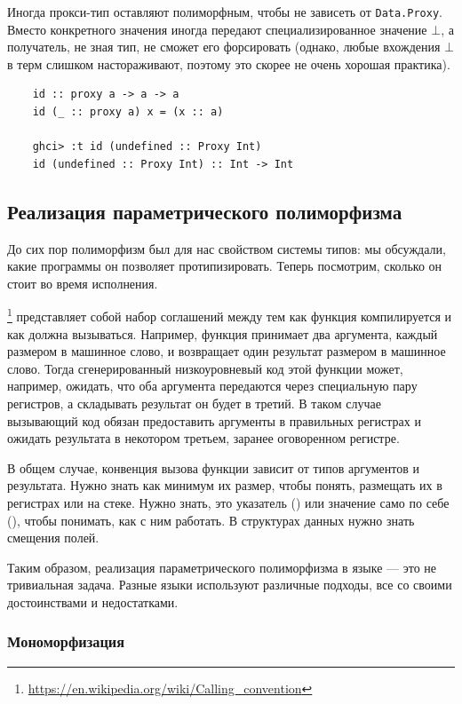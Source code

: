 Иногда прокси-тип оставляют полиморфным, чтобы не зависеть от \texttt{Data.Proxy}.
Вместо конкретного значения иногда передают специализированное значение $\bot$, а получатель, не зная тип, не сможет его форсировать (однако, любые вхождения $\bot$ в терм слишком настораживают, поэтому это скорее не очень хорошая практика).
\begin{verbatim}
    id :: proxy a -> a -> a
    id (_ :: proxy a) x = (x :: a)

    ghci> :t id (undefined :: Proxy Int)
    id (undefined :: Proxy Int) :: Int -> Int
\end{verbatim}

\subsection{Реализация параметрического полиморфизма} \label{subsec:parametric-implementation}

До сих пор полиморфизм был для нас свойством системы типов: мы обсуждали, какие программы он позволяет протипизировать.
Теперь посмотрим, сколько он стоит во время исполнения.

\footnote{\url{https://en.wikipedia.org/wiki/Calling_convention}} представляет собой набор соглашений между тем как функция компилируется и как должна вызываться.
Например, функция принимает два аргумента, каждый размером в машинное слово, и возвращает один результат размером в машинное слово.
Тогда сгенерированный низкоуровневый код этой функции может, например, ожидать, что оба аргумента передаются через специальную пару регистров, а складывать результат он будет в третий.
В таком случае вызывающий код обязан предоставить аргументы в правильных регистрах и ожидать результата в некотором третьем, заранее оговоренном регистре.

В общем случае, конвенция вызова функции зависит от типов аргументов и результата.
Нужно знать как минимум их размер, чтобы понять, размещать их в регистрах или на стеке.
Нужно знать, это указатель () или значение само по себе (), чтобы понимать, как с ним работать.
В структурах данных нужно знать смещения полей.

Таким образом, реализация параметрического полиморфизма в языке --- это не тривиальная задача.
Разные языки используют различные подходы, все со своими достоинствами и недостатками.

\subsubsection{Мономорфизация} \label{subsubsec:monomorphization}

